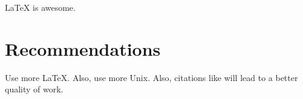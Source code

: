 \documentclass{workreport}
\begin{document}
\begin{body}
	\gls{LaTeX} is awesome.

\section{Recommendations}

	Use more \LaTeX. Also, use more \gls{Unix}. Also, citations like
    	\cite{schweiger_principles_2001} will lead to a better quality of work.

\end{body}



\end{document}
